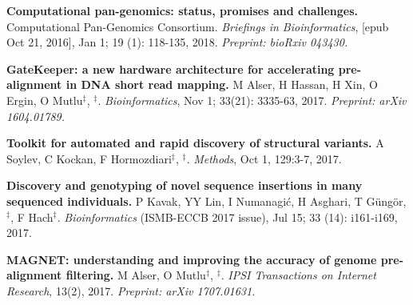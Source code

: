          

         \vspace{-.2cm}        

         {\bf Computational pan-genomics: status, promises and challenges.}
         Computational Pan-Genomics Consortium. {\em Briefings in Bioinformatics}, [epub Oct 21, 2016], Jan 1; 19 (1): 118-135, 2018.
         \textit{Preprint: bioRxiv 043430.}
         
         
         \vspace{-.2cm}
         
         {\bf GateKeeper: a new hardware architecture for accelerating pre-alignment in DNA short read mapping.}
         M Alser, H Hassan, H Xin, O Ergin, O Mutlu$^\ddag$, \calkan{}$^\ddag$.
         {\em Bioinformatics}, Nov 1; 33(21): 3335-63, 2017. \textit{Preprint: arXiv 1604.01789.}

         \vspace{-.2cm}
         {\bf Toolkit for automated and rapid discovery of structural variants.}
          A Soylev, C Kockan, F Hormozdiari$^\ddag$, \calkan{}$^\ddag$.
          {\em Methods}, Oct 1, 129:3-7, 2017.
                                       


  \vspace{-.2cm}
                                     

         {\bf Discovery and genotyping of novel sequence insertions in many sequenced individuals.}
         P Kavak, YY Lin, I Numanagić, H Asghari, T Güngör, \calkan{}$^\ddag$, F Hach$^\ddag$.
         {\em Bioinformatics} (ISMB-ECCB 2017 issue), Jul 15; 33 (14): i161-i169, 2017.\\
         
  \vspace{-.2cm}
                                       
         {\bf MAGNET: understanding and improving the accuracy of genome pre-alignment filtering.}
         M Alser, O Mutlu$^\ddag$, \calkan{}$^\ddag$. 
         {\em IPSI Transactions on Internet Research}, 13(2), 2017. \textit{Preprint: arXiv 1707.01631.}



